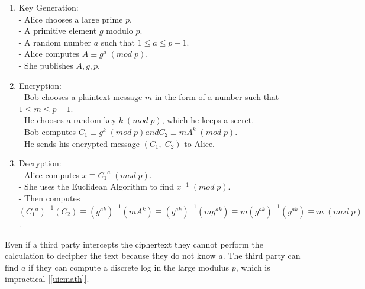 \documentclass[12pt]{article}
\begin{document}
\begin{enumerate}
  \item Key Generation: \\
    - Alice chooses a large prime $p$.\\
    - A primitive element $g$ modulo $p$.\\
    - A random number $a$ such that $1\leq a\leq p-1$.\\
    - Alice computes $A\equiv g^a\;(mod\;p)$. \\
    - She publishes $A,g,p$.
  \item Encryption:\\
  - Bob chooses a plaintext message $m$ in the form of a number such that $1\leq m\leq p-1$.\\
  - He chooses a random key $k\;(mod\;p)$, which he keeps a secret.\\
  - Bob computes $C_1\equiv g^k\;(mod\;p) and C_2\equiv mA^k\;(mod\;p)$.\\
  - He sends his encrypted message $(C_1,\;C_2)$ to Alice.
  \item Decryption:\\
  - Alice computes $x\equiv {C_1}^a\;(mod\;p)$.\\
  - She uses the Euclidean Algorithm to find $x^{-1}\;(mod\;p)$.\\
  - Then computes $({C_1}^a)^{-1}(C_2)\equiv(g^{ak})^{-1}(mA^k)\equiv(g^{ak})^{-1}(mg^{ak})\equiv m(g^{ak})^{-1}(g^{ak})\equiv m\;(mod\;p)$.
\end{enumerate}
Even if a third party intercepts the ciphertext they cannot perform the calculation to decipher the text because they do not know $a$. The third party can find $a$ if they can compute a discrete log in the large modulus $p$, which is impractical [\ref{uicmath}]. 
\end{document}
